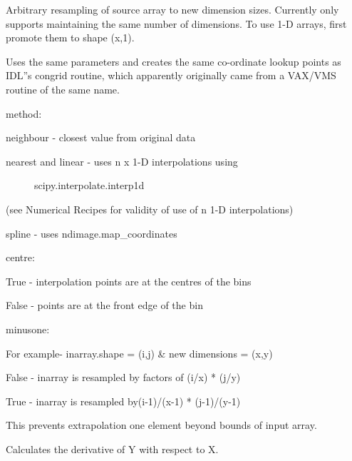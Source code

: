 \documentclass[letterpaper,10pt,english]{sphinxmanual}
\begin{document}
\begin{fulllineitems}
\begin{fulllineitems}
\end{fulllineitems}


\begin{fulllineitems}
\label{tools:pyPLUTO.Tools.congrid}
Arbitrary resampling of source array to new dimension sizes.
Currently only supports maintaining the same number of dimensions.
To use 1-D arrays, first promote them to shape (x,1).

Uses the same parameters and creates the same co-ordinate lookup points
as IDL''s congrid routine, which apparently originally came from a VAX/VMS
routine of the same name.

method:

neighbour - closest value from original data
\begin{description}
\item[{nearest and linear - uses n x 1-D interpolations using}] \leavevmode
scipy.interpolate.interp1d

\end{description}

(see Numerical Recipes for validity of use of n 1-D interpolations)

spline - uses ndimage.map\_coordinates

centre:

True - interpolation points are at the centres of the bins

False - points are at the front edge of the bin

minusone:

For example- inarray.shape = (i,j) \& new dimensions = (x,y)

False - inarray is resampled by factors of (i/x) * (j/y)

True - inarray is resampled by(i-1)/(x-1) * (j-1)/(y-1)

This prevents extrapolation one element beyond bounds of input array.

\end{fulllineitems}


\begin{fulllineitems}
\label{tools:pyPLUTO.Tools.deriv}
Calculates the derivative of Y with respect to X.


\end{fulllineitems}
\end{fulllineitems}
\end{document}
